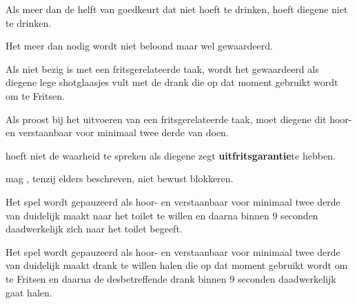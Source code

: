 \vervolgLijst{}
\item \label{regel:niet_hoeven_drinken} Als meer dan de helft van \alleSpelers goedkeurt dat \eenSpeler niet hoeft te drinken, hoeft diegene niet te drinken.
\eindLijst{}

\vervolgLijst{}
\item Het meer \Fritsen dan nodig wordt niet beloond maar wel gewaardeerd.
\eindLijst{}

\vervolgLijst{}
\item Als \eenSpeler niet bezig is met een fritsgerelateerde taak, wordt het gewaardeerd als diegene lege shotglaasjes vult met de drank die op dat moment gebruikt wordt om te Fritsen.
\eindLijst{}

\vervolgLijst{}
\item Als \eenSpeler proost bij het uitvoeren van een fritsgerelateerde taak, moet diegene dit hoor- en verstaanbaar voor minimaal twee derde van \alleSpelers doen.
\eindLijst{}

\vervolgLijst{}
\item \EenSpeler hoeft niet de waarheid te spreken als diegene zegt \textbf{uitfritsgarantie}\footnotemark[2] te hebben.
\eindLijst{}

\vervolgLijst{}
\item \EenSpeler mag \medeSpelersN, tenzij elders beschreven, niet bewust blokkeren.
\label{regel:speler_blokkeren}
\eindLijst{}


\newpage
{}


\vervolgLijst{}
\item Het spel wordt gepauzeerd als \eenSpeler hoor- en verstaanbaar voor minimaal twee derde van \alleSpelers duidelijk maakt naar het toilet te willen en daarna binnen 9 seconden daadwerkelijk zich naar het toilet begeeft.
\label{regel:stilleggen_1}
\eindLijst{}

\vervolgLijst{}
\item Het spel wordt gepauzeerd als \eenSpeler hoor- en verstaanbaar voor minimaal twee derde van \alleSpelers duidelijk maakt drank te willen halen die op dat moment gebruikt wordt om te Fritsen en daarna de desbetreffende drank binnen 9 seconden daadwerkelijk gaat halen.
\label{regel:stilleggen_2}
\eindLijst{}

